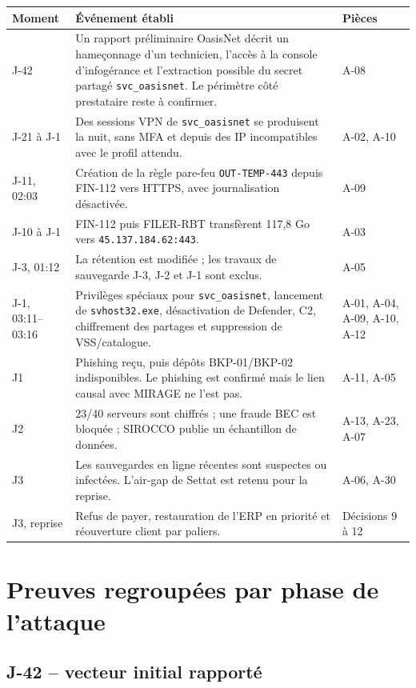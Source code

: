 \documentclass[11pt,a4paper]{article}
\begin{document}
\begin{longtable}{p{2.3cm}p{9.8cm}p{2.1cm}}
\toprule
\textbf{Moment} & \textbf{Événement établi} & \textbf{Pièces} \\
\midrule
\endhead
J-42 & Un rapport préliminaire OasisNet décrit un hameçonnage d'un technicien, l'accès à la console d'infogérance et l'extraction possible du secret partagé \texttt{svc\_oasisnet}. Le périmètre côté prestataire reste à confirmer. & A-08 \\
J-21 à J-1 & Des sessions VPN de \texttt{svc\_oasisnet} se produisent la nuit, sans MFA et depuis des IP incompatibles avec le profil attendu. & A-02, A-10 \\
J-11, 02:03 & Création de la règle pare-feu \texttt{OUT-TEMP-443} depuis FIN-112 vers HTTPS, avec journalisation désactivée. & A-09 \\
J-10 à J-1 & FIN-112 puis FILER-RBT transfèrent 117,8 Go vers \texttt{45.137.184.62:443}. & A-03 \\
J-3, 01:12 & La rétention est modifiée ; les travaux de sauvegarde J-3, J-2 et J-1 sont exclus. & A-05 \\
J-1, 03:11--03:16 & Privilèges spéciaux pour \texttt{svc\_oasisnet}, lancement de \texttt{svhost32.exe}, désactivation de Defender, C2, chiffrement des partages et suppression de VSS/catalogue. & A-01, A-04, A-09, A-10, A-12 \\
J1 & Phishing reçu, puis dépôts BKP-01/BKP-02 indisponibles. Le phishing est confirmé mais le lien causal avec MIRAGE ne l'est pas. & A-11, A-05 \\
J2 & 23/40 serveurs sont chiffrés ; une fraude BEC est bloquée ; SIROCCO publie un échantillon de données. & A-13, A-23, A-07 \\
J3 & Les sauvegardes en ligne récentes sont suspectes ou infectées. L'air-gap de Settat est retenu pour la reprise. & A-06, A-30 \\
J3, reprise & Refus de payer, restauration de l'ERP en priorité et réouverture client par paliers. & Décisions 9 à 12 \\
\bottomrule
\end{longtable}

\section{Preuves regroupées par phase de l'attaque}

\subsection{J-42 -- vecteur initial rapporté}
\end{document}
